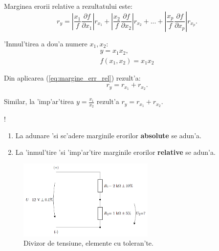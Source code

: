 Marginea erorii relative a rezultatului este:
\begin{equation} \label{eq:margine_err_rel}
r_y = \left|\frac{x_1}{f}\frac{\partial f}{\partial x_1}\right| r_{x_1} + \left|\frac{x_2}{f}\frac{\partial f}{\partial x_2}\right| r_{x_2} + ... + \left|\frac{x_p}{f}\frac{\partial f}{\partial x_p}\right| r_{x_p}.
\end{equation}

\begin{example}[]
  'Inmul'tirea a dou'a numere $x_1, x_2$:
  \begin{align*}
    y = x_1 x_2, \\
    f(x_1,x_2) = x_1 x_2
  \end{align*}

Din aplicarea (\ref{eq:margine_err_rel}) rezult'a:
\begin{equation} 
r_y = r_{x_1} + r_{x_2}.
\end{equation}

Similar, la 'imp'ar'tirea $y=\frac{x_1}{x_2}$ rezult'a $r_y = r_{x_1} + r_{x_2}$.
\end{example}

\begin{retine}
  \label{retine5}
  \index{}\textcolor{black!5}{!}
    \begin{enumerate}
      \item La adunare 'si sc'adere marginile erorilor \textbf{absolute} se adun'a.
      \item La 'inmul'tire 'si 'imp'ar'tire marginile erorilor \textbf{relative} se adun'a.
    \end{enumerate}
\end{retine}

\begin{figure}
	\centering
		\includegraphics[width=0.6\textwidth]{laborator_01/figuri/exemplu_erori}
	\caption{Divizor de tensiune, elemente cu toleran'te.}
	 \label{fig:exemplu_erori}
\end{figure}


